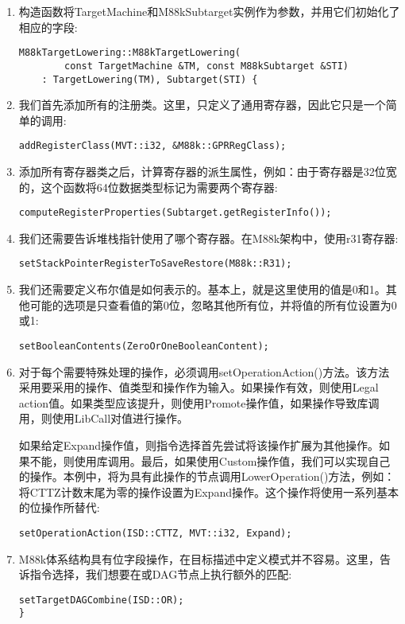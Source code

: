 \begin{enumerate}
\item 构造函数将TargetMachine和M88kSubtarget实例作为参数，并用它们初始化了相应的字段:
\begin{lstlisting}[caption={}]
M88kTargetLowering::M88kTargetLowering(
		const TargetMachine &TM, const M88kSubtarget &STI)
	: TargetLowering(TM), Subtarget(STI) {
\end{lstlisting}

\item 我们首先添加所有的注册类。这里，只定义了通用寄存器，因此它只是一个简单的调用:
\begin{lstlisting}[caption={}]
	addRegisterClass(MVT::i32, &M88k::GPRRegClass);
\end{lstlisting}

\item 添加所有寄存器类之后，计算寄存器的派生属性，例如：由于寄存器是32位宽的，这个函数将64位数据类型标记为需要两个寄存器:
\begin{lstlisting}[caption={}]
	computeRegisterProperties(Subtarget.getRegisterInfo());
\end{lstlisting}

\item 我们还需要告诉堆栈指针使用了哪个寄存器。在M88k架构中，使用r31寄存器:
\begin{lstlisting}[caption={}]
	setStackPointerRegisterToSaveRestore(M88k::R31);
\end{lstlisting}

\item 我们还需要定义布尔值是如何表示的。基本上，就是这里使用的值是0和1。其他可能的选项是只查看值的第0位，忽略其他所有位，并将值的所有位设置为0或1:
\begin{lstlisting}[caption={}]
	setBooleanContents(ZeroOrOneBooleanContent);
\end{lstlisting}

\item 对于每个需要特殊处理的操作，必须调用setOperationAction()方法。该方法采用要采用的操作、值类型和操作作为输入。如果操作有效，则使用Legal action值。如果类型应该提升，则使用Promote操作值，如果操作导致库调用，则使用LibCall对值进行操作。\par
如果给定Expand操作值，则指令选择首先尝试将该操作扩展为其他操作。如果不能，则使用库调用。最后，如果使用Custom操作值，我们可以实现自己的操作。本例中，将为具有此操作的节点调用LowerOperation()方法，例如：将CTTZ计数末尾为零的操作设置为Expand操作。这个操作将使用一系列基本的位操作所替代:
\begin{lstlisting}[caption={}]
	setOperationAction(ISD::CTTZ, MVT::i32, Expand);
\end{lstlisting}

\item M88k体系结构具有位字段操作，在目标描述中定义模式并不容易。这里，告诉指令选择，我们想要在或DAG节点上执行额外的匹配:
\begin{lstlisting}[caption={}]
	setTargetDAGCombine(ISD::OR);
}
\end{lstlisting}

\end{enumerate}

